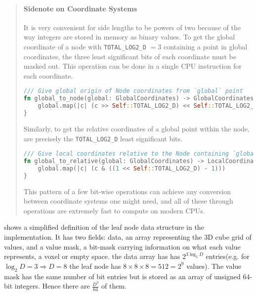 \begin{quote}
  \paragraph{Sidenote on Coordinate Systems}

  It is very convenient for side lengths to be powers of two because of the way integers are stored in memory as binary values. To get the global coordinate of a node with \verb|TOTAL_LOG2_D| $= 3$ containing a point in global coordinates, the three least significant bits of each coordinate must be masked out. This operation can be done in a single CPU instruction for each coordinate.

\begin{lstlisting}[language=rust]
/// Give global origin of Node coordinates from `global` point
fn global_to_node(global: GlobalCoordinates) -> GlobalCoordinates {
    global.map(|c| (c >> Self::TOTAL_LOG2_D) << Self::TOTAL_LOG2_D)
}
\end{lstlisting}

Similarly, to get the relative coordinates of a global point within the node, are precisely the \linebreak \texttt{TOTAL\_LOG2\_D} least significant bits.

\begin{lstlisting}[language=rust]
/// Give local coordinates relative to the Node containing `global` position
fn global_to_relative(global: GlobalCoordinates) -> LocalCoordinates {
    global.map(|c| (c & ((1 << Self::TOTAL_LOG2_D) - 1)))
}
\end{lstlisting}

This pattern of a few bit-wise operations can achieve any conversion between coordinate systems one might need, and all of these through operations are extremely fast to compute on modern CPUs.
\end{quote}

 shows a simplified definition of the leaf node data structure in the implementation. It has two fields: data, an array representing the 3D cube grid of values, and a value mask, a bit-mask carrying information on what each value represents, a voxel or empty space. the data array has has $2^{3\log_{2} D}$ entries(e.g. for $\log_{2} D = 3 \Rightarrow D = 8$ the leaf node has $8\times8\times8 = 512 = 2^{9}$ values). The value mask has the same number of bit entries but is stored as an array of unsigned 64-bit integers. Hence there are $\frac{D^{3}}{64}$ of them.

